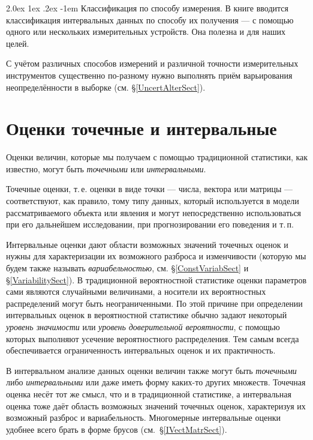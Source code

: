 \documentclass[a5paper,openany]{book}
\makeatletter
\renewcommand\paragraph{\@startsection{paragraph}{4}{\z@}%
                         {2.0ex \@plus1ex \@minus.2ex}%
                         {-1em}%
                         {\normalfont\normalsize\bfseries}}
\makeatother
\begin{document}
\paragraph{Классификация по способу измерения.}  
В книге \cite{NguyenKreinWuXiang} вводится классификация интервальных данных 
по способу их получения --- с помощью одного или нескольких измерительных устройств. 
Она полезна и для наших целей. 
  
С учётом различных способов измерений и различной точности измерительных инструментов 
существенно по-разному нужно выполнять приём варьирования неопределённости в выборке 
(см. \S\ref{UncertAlterSect}). 
  
\section{Оценки точечные и интервальные} 
  
Оценки величин, которые мы получаем с помощью традиционной статистики, как известно, 
могут быть \emph{точечными} или \emph{интервальными}. 
  
Точечные оценки, т.\,е. оценки в виде точки --- числа, вектора или матрицы --- 
соответствуют, как правило, тому типу данных, который используется в модели 
рассматриваемого объекта или явления и могут непосредственно использоваться 
при его дальнейшем исследовании, при прогнозировании его поведения и т.\,п. 
  
Интервальные оценки дают области возможных значений точечных оценок и нужны 
для характеризации их возможного разброса и изменчивости (которую мы будем также 
называть \emph{вариабельностью}, см. \S\ref{ConstVariabSect} 
и \S\ref{VariabilitySect}). В традиционной вероятностной статистике оценки 
параметров сами являются случайными величинами, а носители их вероятностных 
распределений могут быть неограниченными. По этой причине при определении интервальных 
оценок в вероятностной статистике обычно задают некоторый \emph{уровень значимости} 
или \emph{уровень доверительной вероятности}, с помощью которых выполняют усечение 
вероятностного распределения. Тем самым всегда обеспечивается ограниченность 
интервальных оценок и их практичность. 
  
В интервальном анализе данных оценки величин также могут быть \emph{точечными} либо 
\emph{интервальными} или даже иметь форму каких-то других множеств. Точечная оценка 
несёт тот же смысл, что и в традиционной статистике, а интервальная оценка тоже даёт 
область возможных значений точечных оценок, характеризуя их возможный разброс и 
вариабельность. Многомерные интервальные оценки удобнее всего брать в форме брусов 
(см.~\S\ref{IVectMatrSect}). 
  
\end{document}
